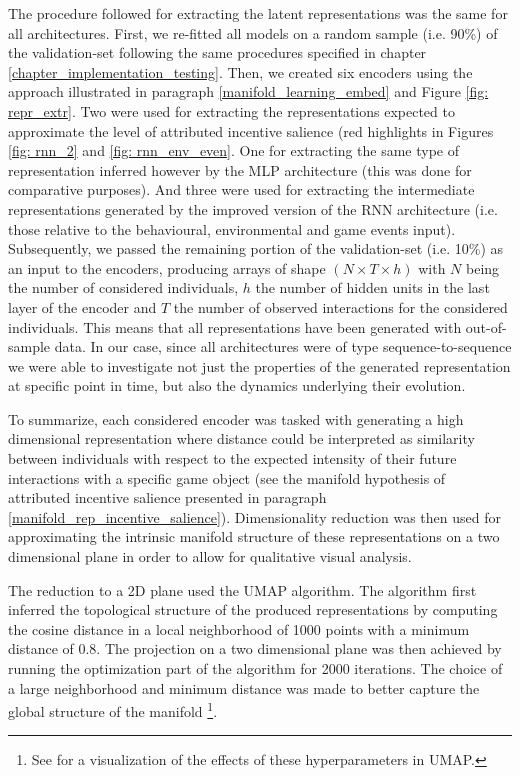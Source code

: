 The procedure followed for extracting the latent representations was the same for all architectures. First, we re-fitted all models on a random sample (i.e. 90\%) of the validation-set following the same procedures specified in chapter \ref{chapter_implementation_testing}. Then, we created six encoders using the approach illustrated in paragraph \ref{manifold_learning_embed} and Figure \ref{fig: repr_extr}. Two were used for extracting the representations expected to approximate the level of attributed incentive salience (red highlights in Figures \ref{fig: rnn_2} and \ref{fig: rnn_env_even}. One for extracting the same type of representation inferred however by the MLP architecture (this was done for comparative purposes). And three were used for extracting the intermediate representations generated by the improved version of the RNN architecture (i.e. those relative to the behavioural, environmental and game events input). Subsequently, we passed the remaining portion of the validation-set (i.e. 10\%) as an input to the encoders, producing arrays of shape $(N \times T \times h)$ with $N$ being the number of considered individuals, $h$ the number of hidden units in the last layer of the encoder and $T$ the number of observed interactions for the considered individuals. This means that all representations have been generated with out-of-sample data. In our case, since all architectures were of type sequence-to-sequence we were able to investigate not just the properties of the generated representation at specific point in time, but also the dynamics underlying their evolution. 

To summarize, each considered encoder was tasked with generating a high dimensional representation where distance could be interpreted as similarity between individuals with respect to the expected intensity of their future interactions with a specific game object (see the manifold hypothesis of attributed incentive salience presented in paragraph \ref{manifold_rep_incentive_salience}). Dimensionality reduction was then used for approximating the intrinsic manifold structure of these representations on a two dimensional plane in order to allow for qualitative visual analysis. 

The reduction to a 2D plane used the UMAP algorithm. The algorithm first inferred the topological structure of the produced representations by computing the cosine distance in a local neighborhood of 1000 points with a minimum distance of 0.8. The projection on a two dimensional plane was then achieved by running the optimization part of the algorithm for 2000 iterations. The choice of a large neighborhood and minimum distance was made to better capture the global structure of the manifold \footnote{See \cite{umapwebs} for a visualization of the effects of these hyperparameters in UMAP.}. 

